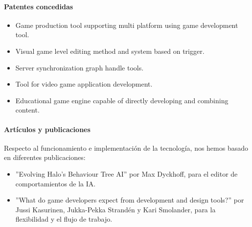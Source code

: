 \documentclass[]{article}
\begin{document}
\paragraph{Patentes concedidas}
\begin{itemize}
	\item Game production tool supporting multi platform using game development tool. \cite{multip}
	\item Visual game level editing method and system based on trigger. \cite{leveledit}
	\item Server synchronization graph handle tools. \cite{Server}
	\item Tool for video game application development. \cite{EA}
	\item Educational game engine capable of directly developing and combining content. \cite{Edu}
\end{itemize}


\paragraph{Art\'iculos y publicaciones}
Respecto al funcionamiento e implementaci\'on de la tecnolog\'ia, nos hemos basado en diferentes publicaciones: 
\begin{itemize}
	\item ''Evolving Halo's Behaviour Tree AI'' por Max Dyckhoff, para el editor de comportamientos de la IA. \cite{Bungie}
	\item ''What do game developers expect from development and design tools?'' por Jussi Kasurinen, Jukka-Pekka Strand\'en y Kari Smolander, para la flexibilidad y el flujo de trabajo. \cite{ACM}
\end{itemize}
\end{document}
